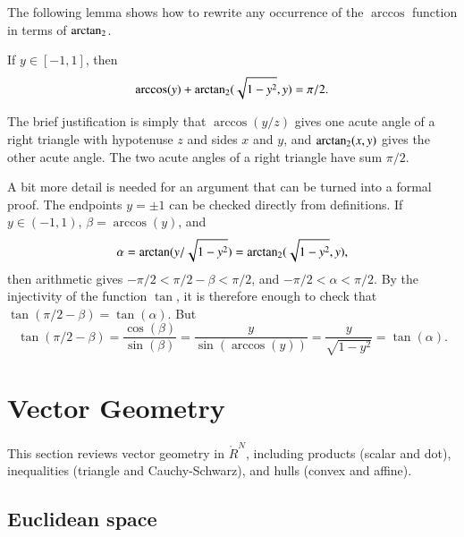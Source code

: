 The following lemma shows how to rewrite any occurrence of the $\arccos$ function
in terms of  ${\operatorname{arctan_2}}$.   


\begin{lemma}[]\label{lemma:arccos-arctan}
  If $y\in [-1,1]$, then
  \[ \arccos(y) +  {\operatorname{arctan_2}}({
      \sqrt{1-y^2}},{y}) = \pi/2.\] 
\end{lemma}
%
%
%
%

\begin{proved}
The brief justification is simply that 
$\arccos(y/z)$ gives one acute angle of a right triangle with
hypotenuse $z$ and sides $x$ and $y$, and ${\operatorname{arctan_2}}(x,y)$ gives the other acute angle.
The two acute angles of a right triangle have sum $\pi/2$.

A bit more detail is needed for an argument that can be turned into a formal proof.
  The endpoints $y=\pm1$ can be checked directly from definitions.  If
  $y\in (-1,1)$, $\beta = \arccos(y)$, and \[ \alpha =
    \arctan(y/\sqrt{1-y^2}) =
    {\operatorname{arctan_2}}({\sqrt{1-y^2}},{y}),\]  then arithmetic gives
  $-\pi/2 < \pi/2 - \beta < \pi/2$, and $-\pi/2 < \alpha
    < \pi/2$.  By the injectivity of
  the function $\tan$, it is therefore enough to check that
  $\tan(\pi/2 - \beta) = \tan(\alpha)$.  But
\[ 
\tan(\pi/2-\beta)=
\frac{\cos(\beta)}{\sin(\beta)} =
\frac{y}{        \sin(\arccos(y))} 
=\frac{y}{ \sqrt{1-y^2}} 
=\tan(\alpha).
\] 
\swallowed\end{proved}



\section{Vector Geometry}

This section reviews vector geometry in $\ring{R}^N$, including
products (scalar and dot), inequalities (triangle and Cauchy-Schwarz),
and hulls (convex and affine).

\subsection{Euclidean space}

